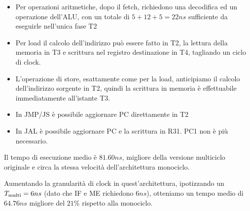 \documentclass[../ace.tex]{subfiles}
\begin{document}
\begin{itemize}
    \item Per operazioni aritmetiche, dopo il fetch, richiedono una decodifica ed un operazione dell'ALU, con un totale
        di $5 + 12 + 5=22ns$ sufficiente da eseguirle nell'unica fase T2
    \item Per load il calcolo dell'indirizzo può essere fatto in T2, la lettura della memoria in T3 e scrittura nel
        registro destinazione in T4, tagliando un ciclo di clock.
    \item L'operazione di store, esattamente come per la load, anticipiamo il calcolo dell'indirizzo sorgente in T2,
        quindi la scrittura in memoria è effettuabile immediatamente all'istante T3.
    \item In JMP/JS è possibile aggiornare PC direttamente in T2
    \item In JAL è possibile aggiornare PC e la scrittura in R31. PC1 non è più necessario.
\end{itemize}

Il tempo di esecuzione medio è $81.60ns$, migliore della versione multiciclo originale e circa la stessa velocità
dell'architettura monociclo.

Aumentando la granularità di clock in quest'architettura, ipotizzando un $T_\text{multi}=6 ns$ (dato che IF e ME richiedono
$6ns$), otteniamo un tempo medio di $64.76ns$ migliore del $21\%$ rispetto alla monociclo.
\end{document}
